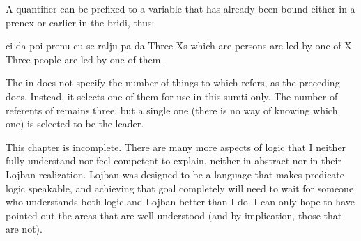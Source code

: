 A quantifier can be prefixed to a variable that has already
    been bound either in a prenex or earlier in the bridi,
    thus:
\begin{example}
ci da poi prenu cu se ralju pa da\n
Three Xs which are-persons are-led-by one-of X\n
Three people are led by one of them.
\end{example}

The  in  does not
    specify the number of things to which  refers, as the
    preceding  does. Instead, it selects one of them for
    use in this sumti only. The number of referents of 
    remains three, but a single one (there is no way of knowing
    which one) is selected to be the leader.



This chapter is incomplete. There are many more aspects of
    logic that I neither fully understand nor feel competent to
    explain, neither in abstract nor in their Lojban realization.
    Lojban was designed to be a language that makes predicate logic
    speakable, and achieving that goal completely will need to wait
    for someone who understands both logic and Lojban better than I
    do. I can only hope to have pointed out the areas that are
    well-understood (and by implication, those that are not).
